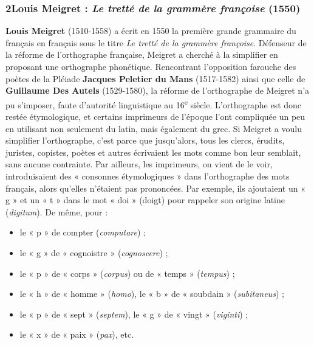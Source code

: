 \subsubsection*{2\quad Louis Meigret : \textit{Le tretté de la grammère françoise} (1550)}
\textbf{Louis Meigret} (1510-1558) a écrit en 1550 la première grande grammaire du français en français sous le titre \textit{Le tretté de la grammère françoise}.
Défenseur de la réforme de l’orthographe française, Meigret a cherché à la simplifier en proposant une orthographe phonétique. Rencontrant l’opposition farouche des poètes de la Pléiade \textbf{Jacques Peletier du Mans} (1517-1582) ainsi que celle de \textbf{Guillaume Des Autels} (1529-1580), la réforme de l’orthographe de Meigret n’a pu s’imposer, faute d’autorité linguistique au 16\textsuperscript{e} siècle. L’orthographe est donc restée étymologique, et certains imprimeurs de l’époque l’ont compliquée un peu en utilisant non seulement du latin, mais également du grec.
Si Meigret a voulu simplifier l’orthographe, c’est parce que jusqu’alors, tous les clercs, érudits, juristes, copistes, poètes et autres écrivaient les mots comme bon leur semblait, sans aucune contrainte. Par ailleurs, les imprimeurs, on vient de le voir, introduisaient des « consonnes étymologiques » dans l’orthographe des mots français, alors qu’elles n’étaient pas prononcées. Par exemple, ils ajoutaient un « g » et un « t » dans le mot « doi » (doigt) pour rappeler son origine latine (\textit{digitum}). De même, pour :
\begin{itemize}
\item le « p » de compter (\textit{computare}) ;
\item le « g » de « cognoistre » (\textit{cognoscere}) ;
\item le « p » de « corps » (\textit{corpus}) ou de « temps » (\textit{tempus}) ;
\item le « h » de « homme » (\textit{homo}), le « b » de « soubdain » (\textit{subitaneus}) ;
\item le « p » de « sept » (\textit{septem}), le « g » de « vingt » (\textit{viginti}) ;
\item le « x » de « paix » (\textit{pax}), etc.
\end{itemize}
